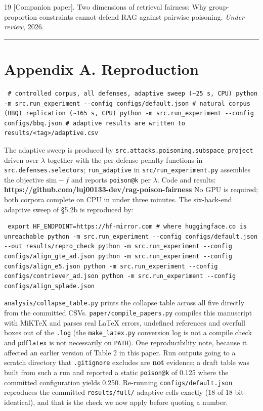 \documentclass[review,3p,times]{elsarticle}
\begin{document}
\begin{thebibliography}{19}
 {[}Companion paper{]}. Two dimensions of retrieval fairness: Why group-proportion constraints cannot defend RAG against pairwise poisoning. \emph{Under review}, 2026. \begin{center}\rule{0.5\linewidth}{0.5pt}\end{center} \section{Appendix A. Reproduction}\label{appendix-a.-reproduction} \begin{verbatim} # controlled corpus, all defenses, adaptive sweep (~25 s, CPU) python -m src.run_experiment --config configs/default.json # natural corpus (BBQ) replication (~165 s, CPU) python -m src.run_experiment --config configs/bbq.json # adaptive results are written to results/<tag>/adaptive.csv \end{verbatim} The adaptive sweep is produced by \texttt{src.attacks.poisoning.subspace\_project} driven over \(\lambda\) together with the per-defense penalty functions in \texttt{src.defenses.selectors}; \texttt{run\_adaptive} in \texttt{src/run\_experiment.py} assembles the objective \(\mathrm{sim} - f\) and reports \texttt{poison@k} per \(\lambda\). Code and results: \textbf{https://github.com/luj00133-dev/rag-poison-fairness} No GPU is required; both corpora complete on CPU in under three minutes. The six-back-end adaptive sweep of §5.2b is reproduced by: \begin{verbatim} export HF_ENDPOINT=https://hf-mirror.com # where huggingface.co is unreachable python -m src.run_experiment --config configs/default.json --out results/repro_check python -m src.run_experiment --config configs/align_gte_ad.json python -m src.run_experiment --config configs/align_e5.json python -m src.run_experiment --config configs/contriever_ad.json python -m src.run_experiment --config configs/align_splade.json \end{verbatim} \texttt{analysis/collapse\_table.py} prints the collapse table across all five directly from the committed CSVs. \texttt{paper/compile\_papers.py} compiles this manuscript with MiKTeX and parses real LaTeX errors, undefined references and overfull boxes out of the \texttt{.log} (the \texttt{make\_latex.py} conversion log is not a compile check and \texttt{pdflatex} is not necessarily on \texttt{PATH}). One reproducibility note, because it affected an earlier version of Table 2 in this paper. Run outputs going to a scratch directory that \texttt{.gitignore} excludes are \textbf{not} evidence: a draft table was built from such a run and reported a static \texttt{poison@k} of 0.125 where the committed configuration yields 0.250. Re-running \texttt{configs/default.json} reproduces the committed \texttt{results/full/} adaptive cells exactly (18 of 18 bit-identical), and that is the check we now apply before quoting a number.
\end{thebibliography}
\end{document}
